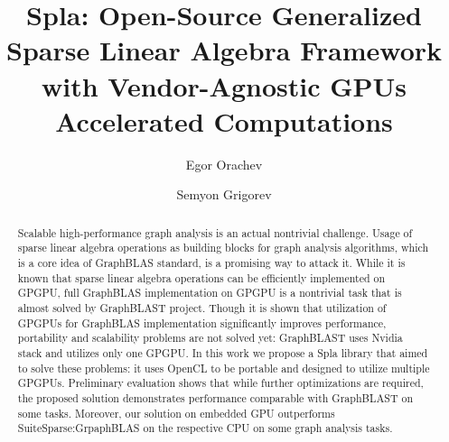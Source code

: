 \documentclass[sigconf, anonymous, review,table]{acmart}
\begin{document}
\title{Spla: Open-Source Generalized Sparse Linear Algebra Framework with Vendor-Agnostic GPUs Accelerated Computations}

\author{Egor Orachev}
\author{Semyon Grigorev}



\renewcommand{\shortauthors}{Orachev, Grigorev}

\begin{abstract}
    Scalable high-performance graph analysis is an actual nontrivial challenge. Usage of sparse linear algebra operations as building blocks for graph analysis algorithms, which is a core idea of GraphBLAS standard, is a promising way to attack it.
    While it is known that sparse linear algebra operations can be efficiently implemented on GPGPU, full GraphBLAS implementation on GPGPU is a nontrivial task that is almost solved by GraphBLAST project. Though it is shown that utilization of GPGPUs for GraphBLAS implementation significantly improves performance, portability and scalability problems are not solved yet: GraphBLAST uses Nvidia stack and utilizes only one GPGPU.
    In this work we propose a Spla library that aimed to solve these problems: it uses OpenCL to be portable and designed to utilize multiple GPGPUs.
    Preliminary evaluation shows that while further optimizations are required, the proposed solution demonstrates performance comparable with GraphBLAST on some tasks. Moreover, our solution on embedded GPU outperforms SuiteSparse:GrpaphBLAS on the respective CPU on some graph analysis tasks.
\end{abstract}
\end{document}
